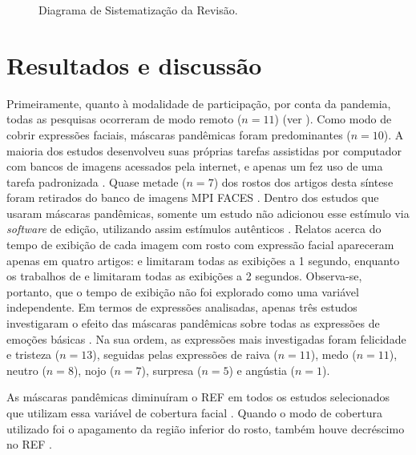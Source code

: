 \documentclass[portuguese]{textolivre}
\begin{document}
\begin{figure}
\begin{minipage}{.85\textwidth}
{ 
  }
\caption{Diagrama de Sistematização da Revisão.}
\label{fig-img-a}
\end{minipage}
\end{figure}


\section{Resultados e discussão}\label{sec-organizacao}

Primeiramente, quanto à modalidade de participação, por conta da pandemia, todas as pesquisas ocorreram de modo remoto ($n=11$) (ver ). Como modo de cobrir expressões faciais, máscaras pandêmicas foram predominantes ($n=10$). A maioria dos estudos desenvolveu suas próprias tarefas assistidas por computador com bancos de imagens acessados pela internet, e apenas um fez uso de uma tarefa padronizada \cite{bani_behind_2021}. Quase metade ($n=7$) dos rostos dos artigos desta síntese foram retirados do banco de imagens MPI FACES \cite{ebner_facesdatabase_2010}. Dentro dos estudos que usaram máscaras pandêmicas, somente um estudo não adicionou esse estímulo via \textit{software} de edição, utilizando assim estímulos autênticos \cite{noyes_effect_2021}. Relatos acerca do tempo de exibição de cada imagem com rosto com expressão facial apareceram apenas em quatro artigos: \textcite{marini_impact_2021} e \textcite{noyes_effect_2021} limitaram todas as exibições a 1 segundo, enquanto os trabalhos de \textcite{bani_behind_2021} e \textcite{grundmann_face_2020} limitaram todas as exibições a 2 segundos. Observa-se, portanto, que o tempo de exibição não foi explorado como uma variável independente. Em termos de expressões analisadas, apenas três estudos investigaram o efeito das máscaras pandêmicas sobre todas as expressões de emoções básicas \cite{carbon_impact_2021, kang_age_2021, ramachandra_unmasking_2022}. Na sua ordem, as expressões mais investigadas foram felicidade e tristeza ($n=13$), seguidas pelas expressões de raiva ($n=11$), medo ($n=11$), neutro ($n=8$), nojo ($n=7$), surpresa ($n=5$) e angústia ($n=1$). 

As máscaras pandêmicas diminuíram o REF em todos os estudos selecionados que utilizam essa variável de cobertura facial \cite{bani_behind_2021, carbon_impact_2021, carbon_wearing_2020, calbi_consequences_2021, gori_masking_2021, grundmann_face_2020, kang_age_2021,marini_impact_2021, marini_impact_2021, marini_impact_2021, parada-fernandez_wearing_2022, pazhoohi_facial_2021}. Quando o modo de cobertura utilizado foi o apagamento da região inferior do rosto, também houve decréscimo no REF \cite{ramachandra_unmasking_2022}.
\end{document}

